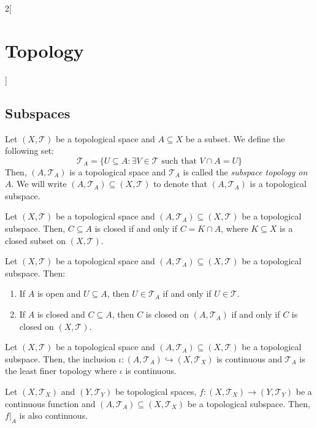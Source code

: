 \documentclass[../../../main.tex]{subfiles}
\begin{document}
\begin{multicols}{2}[\section{Topology}]
  \subsection{Subspaces}
  \begin{definition}
    Let $(X,\mathcal{T})$ be a topological space and $A\subseteq X$ be a subset. We define the following set: $$\mathcal{T}_A=\{U\subseteq A:\exists V\in\mathcal{T}\text{ such that }V\cap A=U\}$$ Then, $(A,\mathcal{T}_A)$ is a topological space and $\mathcal{T}_A$ is called the \textit{subspace topology on $A$}. We will write $(A,\mathcal{T}_A)\subseteq (X,\mathcal{T})$ to denote that $(A,\mathcal{T}_A)$ is a topological subspace.
  \end{definition}
  \begin{prop}
    Let $(X,\mathcal{T})$ be a topological space and $(A,\mathcal{T}_A)\subseteq (X,\mathcal{T})$ be a topological subspace. Then, $C\subseteq A$ is closed if and only if $C=K\cap A$, where $K\subseteq X$ is a closed subset on $(X,\mathcal{T})$.
  \end{prop}
  \begin{prop}
    Let $(X,\mathcal{T})$ be a topological space and $(A,\mathcal{T}_A)\subseteq (X,\mathcal{T})$ be a topological subspace. Then:
    \begin{enumerate}
      \item If $A$ is open and $U\subseteq A$, then $U\in\mathcal{T}_A$ if and only if $U\in\mathcal{T}$.
      \item If $A$ is closed and $C\subseteq A$, then $C$ is closed on $(A,\mathcal{T}_A)$ if and only if $C$ is closed on $(X,\mathcal{T})$.
    \end{enumerate}
  \end{prop}
  \begin{prop}
    Let $(X,\mathcal{T})$ be a topological space and $(A,\mathcal{T}_A)\subseteq (X,\mathcal{T})$ be a topological subspace. Then, the inclusion $\iota:(A,\mathcal{T}_A)\hookrightarrow (X,\mathcal{T}_X)$ is continuous and $\mathcal{T}_A$ is the least finer topology where $\iota$ is continuous.
  \end{prop}
  \begin{corollary}
    Let $(X,\mathcal{T}_X)$ and $(Y,\mathcal{T}_Y)$ be topological spaces, $f:(X,\mathcal{T}_X)\rightarrow (Y,\mathcal{T}_Y)$ be a continuous function and $(A,\mathcal{T}_A)\subseteq (X,\mathcal{T}_X)$ be a topological subspace. Then, $f|_A$ is also continuous.
  \end{corollary}
  \begin{prop}

\end{prop}
\end{multicols}
\end{document}
